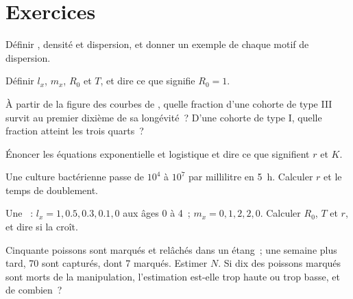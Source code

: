 \section{Exercices}

\begin{exercise}[$\star$]\label{exo:b1:populations:1}
Définir , densité et dispersion, et donner un exemple de
chaque motif de dispersion.
\end{exercise}

\begin{exercise}[$\star$]\label{exo:b1:populations:2}
Définir $l_x$, $m_x$, $R_0$ et $T$, et dire ce que signifie $R_0 = 1$.
\end{exercise}

\begin{exercise}[$\star$]\label{exo:b1:populations:3}
À partir de la figure des courbes de , quelle fraction d'une
cohorte de type III survit au premier dixième de sa longévité~? D'une
cohorte de type I, quelle fraction atteint les trois quarts~?
\end{exercise}

\begin{exercise}[$\star$]\label{exo:b1:populations:4}
Énoncer les équations exponentielle et logistique et dire ce que
signifient $r$ et $K$.
\end{exercise}

\begin{exercise}[$\star\star$]\label{exo:b1:populations:5}
Une culture bactérienne passe de $10^4$ à $10^7$  par
millilitre en \qty{5}{h}. Calculer $r$ et le temps de doublement.
\end{exercise}

\begin{exercise}[$\star\star$]\label{exo:b1:populations:6}
Une ~: $l_x = 1, 0.5, 0.3, 0.1, 0$ aux âges 0 à 4~; $m_x = 0,
1, 2, 2, 0$. Calculer $R_0$, $T$ et $r$, et dire si la 
croît.
\end{exercise}

\begin{exercise}[$\star\star$]\label{exo:b1:populations:7}
Cinquante poissons sont marqués et relâchés dans un étang~; une semaine
plus tard, 70 sont capturés, dont 7 marqués. Estimer $N$. Si dix des
poissons marqués sont morts de la manipulation, l'estimation est-elle
trop haute ou trop basse, et de combien~?
\end{exercise}

